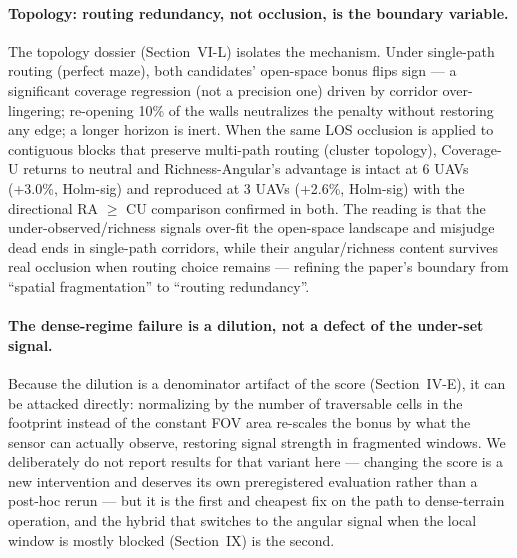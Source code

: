 \documentclass[journal]{IEEEtran}
\begin{document}
\paragraph{Topology: routing redundancy, not occlusion, is the boundary
variable.}
The topology dossier (Section~VI-L) isolates the mechanism.
Under single-path routing (perfect maze), both candidates' open-space bonus
flips sign --- a significant coverage regression (not a precision one) driven
by corridor over-lingering; re-opening 10\% of the walls neutralizes the
penalty without restoring any edge; a longer horizon is inert. When the same
LOS occlusion is applied to contiguous blocks that preserve multi-path routing
(cluster topology), Coverage-U returns to neutral and Richness-Angular's
advantage is intact at 6 UAVs (+3.0\%, Holm-sig) and reproduced at 3 UAVs
(+2.6\%, Holm-sig) with the directional RA $\geq$ CU comparison confirmed in
both. The reading is that the under-observed/richness signals over-fit the
open-space landscape and misjudge dead ends in single-path corridors, while
their angular/richness content survives real occlusion when routing choice
remains --- refining the paper's boundary from ``spatial fragmentation'' to
``routing redundancy''.

\paragraph{The dense-regime failure is a dilution, not a defect of the
under-set signal.}
Because the dilution is a denominator artifact of the score
(Section~IV-E), it can be attacked directly: normalizing by the number of
traversable cells in the footprint instead of the constant FOV area re-scales
the bonus by what the sensor can actually observe, restoring signal strength in
fragmented windows. We deliberately do not report results for that variant here
--- changing the score is a new intervention and deserves its own preregistered
evaluation rather than a post-hoc rerun --- but it is the first and cheapest
fix on the path to dense-terrain operation, and the hybrid that switches to
the angular signal when the local window is mostly blocked (Section~IX) is the
second.
\end{document}
